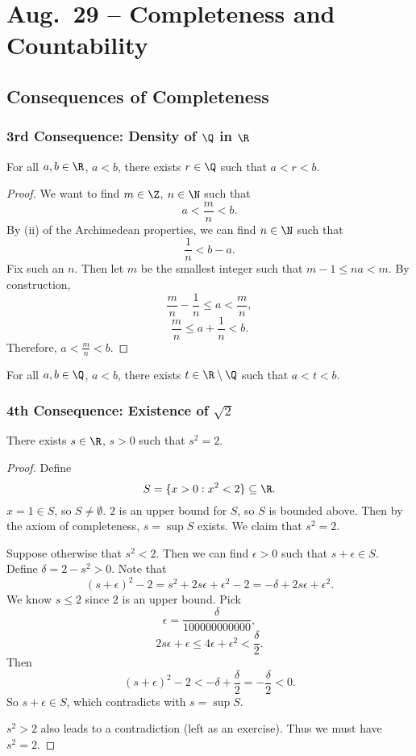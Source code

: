 \chapter{Aug.~29 -- Completeness and Countability}

\section{Consequences of Completeness}

\subsection{3rd Consequence: Density of $\Q$ in $\R$}
\begin{theorem}[Density of $\Q$ in $\R$]
For all $a, b \in \R$, $a < b$, there exists
$r \in \Q$ such that $a < r < b$.
\end{theorem}

\begin{proof}
  We want to find $m \in \Z$, $n \in \N$ such that
  \[
  a < \frac{m}{n} < b
  .\]
  By (ii) of the Archimedean properties, we can find
  $n \in \N$ such that
  \[
  \frac{1}{n} < b - a
  .\]
  Fix such an $n$. Then let $m$ be the smallest integer
  such that $m - 1 \le na < m$. By construction,
  \[
  \frac{m}{n} - \frac{1}{n} \le a < \frac{m}{n},
  \]
  \[\frac{m}{n} \le a + \frac{1}{n} < b.\]
  Therefore, $a < \frac{m}{n} < b$.
\end{proof}

\begin{corollary}
  For all $a, b \in \Q$, $a < b$, there exists
   $t \in \R \setminus \Q$ such that  $a < t < b$.
\end{corollary}

\subsection{4th Consequence: Existence of $\sqrt{2}$}
\begin{theorem}
  There exists $s \in \R$, $s > 0$ such that $s^2 = 2$.
\end{theorem}

\begin{proof}
  Define
  \[S = \{x > 0 : x^2 < 2\} \subseteq \R.\]
  $x = 1 \in S$, so $S \ne \emptyset$. $2$ is an upper
  bound for $S$, so $S$ is bounded above. Then by the
  axiom of completeness, $s = \sup S$ exists.
  We claim that $s^2 = 2$. 

  Suppose otherwise that $s^2 < 2$. Then we can find
  $\epsilon > 0$ such that $s + \epsilon \in S$.
  Define $\delta = 2 - s^2 > 0$. Note that
  \[(s + \epsilon)^2 - 2 = s^2 + 2s\epsilon + \epsilon^2 - 2 = -\delta + 2s\epsilon + \epsilon^2.\]
  We know $s \le 2$ since $2$ is an upper bound. 
  Pick
  \[\epsilon = \frac{\delta}{100000000000},\]
  \[
  2s\epsilon + \epsilon \le 4\epsilon + \epsilon^2 < \frac{\delta}{2}
  .\]
  Then
  \[
  (s + \epsilon)^2 - 2 < -\delta + \frac{\delta}{2}
  = -\frac{\delta}{2} < 0
  .\]
  So $s + \epsilon \in S$, which contradicts with
  $s = \sup S$.

  $s^2 > 2$ also leads to a contradiction
  (left as an exercise). Thus we must have $s^2 = 2$.
\end{proof}

